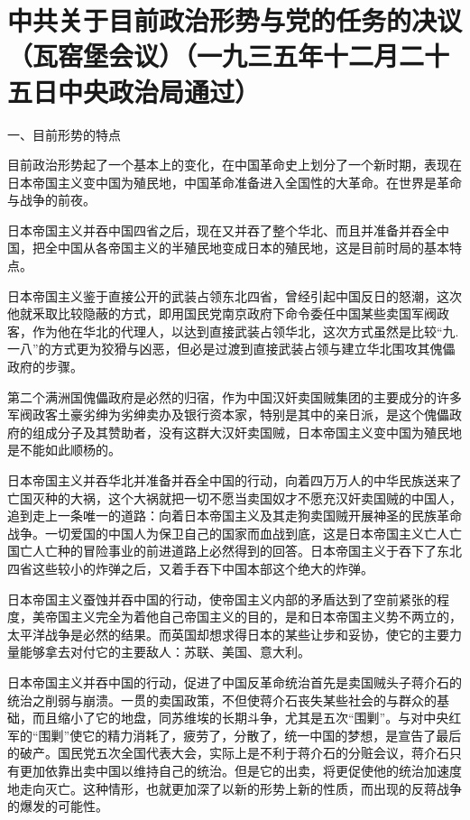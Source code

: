 \section[中共关于目前政治形势与党的任务的决议（瓦窑堡会议）（一九三五年十二月二十五日中央政治局通过）]{中共关于目前政治形势与党的任务的决议（瓦窑堡会议）（一九三五年十二月二十五日中央政治局通过）}


一、目前形势的特点

目前政治形势起了一个基本上的变化，在中国革命史上划分了一个新时期，表现在日本帝国主义变中国为殖民地，中国革命准备进入全国性的大革命。在世界是革命与战争的前夜。

日本帝国主义并吞中国四省之后，现在又并吞了整个华北、而且并准备并吞全中国，把全中国从各帝国主义的半殖民地变成日本的殖民地，这是目前时局的基本特点。

日本帝国主义鉴于直接公开的武装占领东北四省，曾经引起中国反日的怒潮，这次他就釆取比较隐蔽的方式，即用国民党南京政府下命令委任中国某些卖国军阀政客，作为他在华北的代理人，以达到直接武装占领华北，这次方式虽然是比较“九.一八”的方式更为狡猾与凶恶，但必是过渡到直接武装占领与建立华北围攻其傀儡政府的步骤。

第二个满洲国傀儡政府是必然的归宿，作为中国汉奸卖国贼集团的主要成分的许多军阀政客土豪劣绅为劣绅卖办及银行资本家，特别是其中的亲日派，是这个傀儡政府的组成分子及其赞助者，没有这群大汉奸卖国贼，日本帝国主义变中国为殖民地是不能如此顺杨的。

日本帝国主义并吞华北并准备并吞全中国的行动，向着四万万人的中华民族送来了亡国灭种的大祸，这个大祸就把一切不愿当卖国奴才不愿充汉奸卖国贼的中国人，追到走上一条唯一的道路：向着日本帝国主义及其走狗卖国贼开展神圣的民族革命战争。一切爱国的中国人为保卫自己的国家而血战到底，这是日本帝国主义亡人亡国亡人亡种的冒险事业的前进道路上必然得到的回答。日本帝国主义于吞下了东北四省这些较小的炸弹之后，又着手吞下中国本部这个绝大的炸弹。

日本帝国主义蚕蚀并吞中国的行动，使帝国主义内部的矛盾达到了空前紧张的程度，美帝国主义完全为着他自己帝国主义的目的，是和日本帝国主义势不两立的，太平洋战争是必然的结果。而英国却想求得日本的某些让步和妥协，使它的主要力量能够拿去对付它的主要敌人：苏联、美国、意大利。

日本帝国主义并吞中国的行动，促进了中国反革命统治首先是卖国贼头子蒋介石的统治之削弱与崩溃。一贯的卖国政策，不但使蒋介石丧失某些社会的与群众的基础，而且缩小了它的地盘，同苏维埃的长期斗争，尤其是五次“围剿”。与对中央红军的“围剿”使它的精力消耗了，疲劳了，分散了，统一中国的梦想，是宣告了最后的破产。国民党五次全国代表大会，实际上是不利于蒋介石的分赃会议，蒋介石只有更加依靠出卖中国以维持自己的统治。但是它的出卖，将更促使他的统治加速度地走向灭亡。这种情形，也就更加深了以新的形势上新的性质，而出现的反蒋战争的爆发的可能性。

